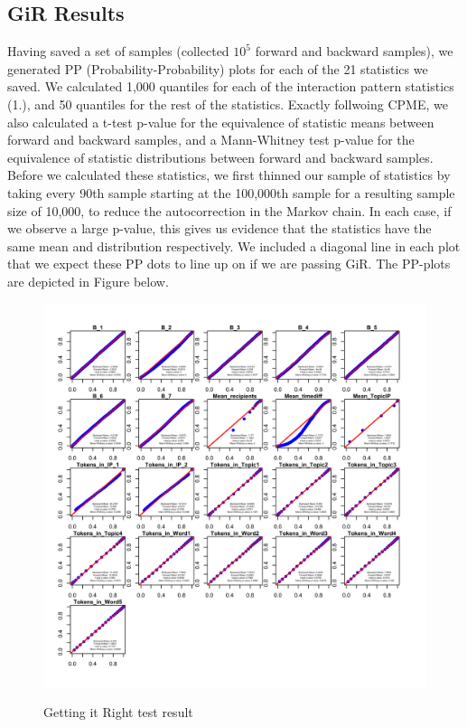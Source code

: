 \documentclass[a4paper]{article}
\begin{document}
\subsection{GiR Results}
Having saved a set of samples (collected $10^5$ forward and backward samples), we generated PP (Probability-Probability)  plots for each of the 21 statistics we saved. We calculated 1,000 quantiles for each of the interaction pattern statistics (1.), and 50 quantiles for the rest of the statistics. Exactly follwoing CPME, we also calculated a t-test p-value for the equivalence
of statistic means between forward and backward samples, and a Mann-Whitney test p-value for the equivalence of statistic
distributions between forward and backward samples. Before we calculated these statistics, we first thinned our sample of
statistics by taking every 90th sample starting at the 100,000th sample for a resulting sample size of 10,000, to reduce the autocorrection in the Markov chain. In each case, if we observe a large p-value, this gives us evidence that the statistics have the same mean and distribution respectively. We included a diagonal line in each plot that we expect these PP dots to line up on if we are passing GiR. The PP-plots are depicted in Figure below.
\begin{figure}[H]
	\centering
	\includegraphics[width=1.05\textwidth]{GiRplot.png} 
	\label{fig:GiR}
	\caption{Getting it Right test result}
\end{figure}
\end{document}
